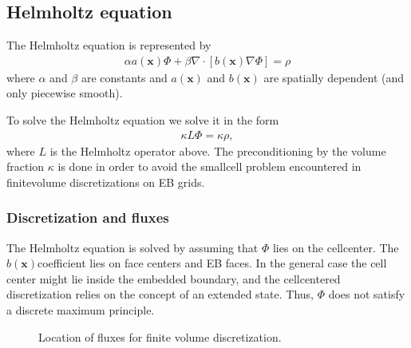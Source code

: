 \documentclass[letterpaper,10pt,english]{sphinxmanual}
\let\sphinxpxdimen\pdfpxdimen\else\newdimen\sphinxpxdimen
\begin{document}
\subsection{Helmholtz equation}
\label{\detokenize{Source/LinearSolvers:helmholtz-equation}}\label{\detokenize{Source/LinearSolvers:chap-helmholtz}}
The Helmholtz equation is represented by
\begin{equation*}
\begin{split}\alpha a\left(\mathbf{x}\right)\Phi + \beta\nabla\cdot\left[b\left(\mathbf{x}\right)\nabla\Phi\right] = \rho\end{split}
\end{equation*}
where \(\alpha\) and \(\beta\) are constants and \(a\left(\mathbf{x}\right)\) and \(b\left(\mathbf{x}\right)\) are spatially dependent (and only piecewise smooth).

To solve the Helmholtz equation we solve it in the form
\begin{equation*}
\begin{split}\kappa L\Phi = \kappa\rho,\end{split}
\end{equation*}
where \(L\) is the Helmholtz operator above.
The preconditioning by the volume fraction \(\kappa\) is done in order to avoid the small\sphinxhyphen{}cell problem encountered in finite\sphinxhyphen{}volume discretizations on EB grids.


\subsubsection{Discretization and fluxes}
\label{\detokenize{Source/LinearSolvers:discretization-and-fluxes}}
The Helmholtz equation is solved by assuming that \(\Phi\) lies on the cell\sphinxhyphen{}center.
The \(b\left(\mathbf{x}\right)\)\sphinxhyphen{}coefficient lies on face centers and EB faces.
In the general case the cell center might lie inside the embedded boundary, and the cell\sphinxhyphen{}centered discretization relies on the concept of an extended state.
Thus, \(\Phi\) does not satisfy a discrete maximum principle.

\begin{figure}[htb]
\centering
\capstart

\noindent\sphinxincludegraphics[width=360\sphinxpxdimen]{{CutCell}.png}
\caption{Location of fluxes for finite volume discretization.}\label{\detokenize{Source/LinearSolvers:id1}}\label{\detokenize{Source/LinearSolvers:fig-helmholtzfluxes}}\end{figure}
\end{document}
